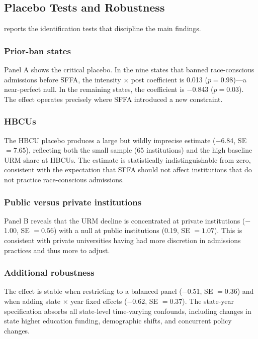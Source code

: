 \documentclass[12pt]{article}
\begin{document}


\subsection{Placebo Tests and Robustness}

 reports the identification tests that discipline the main findings.

\subsubsection*{Prior-ban states} Panel A shows the critical placebo. In the nine states that banned race-conscious admissions before SFFA, the intensity $\times$ post coefficient is 0.013 ($p = 0.98$)---a near-perfect null. In the remaining states, the coefficient is $-$0.843 ($p = 0.03$). The effect operates precisely where SFFA introduced a new constraint.

\subsubsection*{HBCUs} The HBCU placebo produces a large but wildly imprecise estimate ($-$6.84, SE $= 7.65$), reflecting both the small sample (65 institutions) and the high baseline URM share at HBCUs. The estimate is statistically indistinguishable from zero, consistent with the expectation that SFFA should not affect institutions that do not practice race-conscious admissions.

\subsubsection*{Public versus private institutions} Panel B reveals that the URM decline is concentrated at private institutions ($-$1.00, SE $= 0.56$) with a null at public institutions (0.19, SE $= 1.07$). This is consistent with private universities having had more discretion in admissions practices and thus more to adjust.

\subsubsection*{Additional robustness} The effect is stable when restricting to a balanced panel ($-$0.51, SE $= 0.36$) and when adding state $\times$ year fixed effects ($-$0.62, SE $= 0.37$). The state-year specification absorbs all state-level time-varying confounds, including changes in state higher education funding, demographic shifts, and concurrent policy changes.
\end{document}
